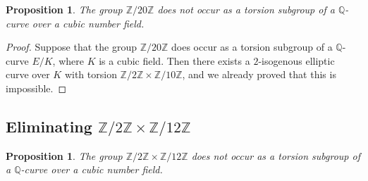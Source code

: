 \documentclass[10pt,leqno]{amsart}
\newcommand{\Z}{\mathbb{Z}}
\newcommand{\Q}{\mathbb{Q}}
\newtheorem{proposition}[theorem]{Proposition}
\theoremstyle{definition}
\theoremstyle{remark}
\numberwithin{theorem}{section}
\begin{document}
\begin{proposition}\label{eliminiraj20}
    The group $\Z/20\Z$ does not occur as a torsion subgroup of a $\Q$-curve over a cubic number field.
\end{proposition}

\begin{proof}
Suppose that the group $\Z/20\Z$ does occur as a torsion subgroup of a $\Q$-curve $E/K$, where $K$ is a cubic field. Then there exists a $2$-isogenous elliptic curve over $K$ with torsion $\Z/2 \Z\times \Z/10\Z$, and we already proved that this is impossible.
\end{proof}



\subsection{Eliminating $\Z/2\Z \times \Z/12\Z$}
\begin{proposition}\label{eliminiraj2x12}
    The group $\Z/2\Z \times \Z/12\Z$ does not occur as a torsion subgroup of a $\Q$-curve over a cubic number field.
\end{proposition}
\end{document}
